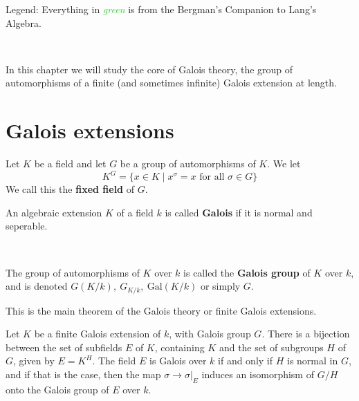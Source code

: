 
\usepackage{thmtools}


\newcommand{\Gal}{\text{Gal}}
\newcommand{\Bergman}[1]{\textcolor{LimeGreen}{\textit{#1}}}

Legend: Everything in \Bergman{green} is from the Bergman's Companion to Lang's Algebra.

\

In this chapter we will study the core of Galois theory, the group of automorphisms of a finite (and sometimes infinite) Galois extension at length.
    \section{Galois extensions}
\begin{definition}
    Let $K$ be a field and let $G$ be a group of automorphisms of $K$. We let \[K^G = \{x\in K\mid x^\sigma = x \text{ for all }\sigma \in G\}\]We call this the \textbf{fixed field} of $G$. 
\end{definition}

\begin{definition}
    An algebraic extension $K$ of a field $k$ is called \textbf{Galois} if it is normal and seperable.

    \

    The group of automorphisms of $K$ over $k$ is called the \textbf{Galois group} of $K$ over $k$, and is denoted $G(K/k), \ G_{K/k}, \ \Gal(K/k)$ or simply $G$.
\end{definition}

This is the main theorem of the Galois theory or finite Galois extensions.
\begin{theorem}\label{main}
    Let $K$ be a finite Galois extension of $k$, with Galois group $G$. There is a bijection between the set of subfields $E$ of $K$, containing $K$ and the set of subgroups $H$ of $G$, given by $E=K^H$. The field $E$ is Galois over $k$ if and only if $H$ is normal in $G$, and if that is the case, then the map $\sigma\rightarrow \sigma|_E$ induces an isomorphism
    of $G/H$ onto the Galois group of $E$ over $k$.
\end{theorem}

